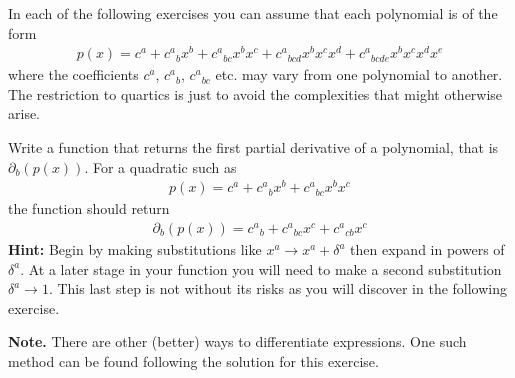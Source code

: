 \documentclass[a4paper,12pt]{article}
\numberwithin{equation}{section}%
\begin{document}
\begin{Exercises}

   In each of the following exercises you can assume that each polynomial is of the form
   \begin{align*}
      p(x) = c^{a}
           + c^{a}{}_{b} x^b
           + c^{a}{}_{b c} x^b x^c
           + c^{a}{}_{b c d} x^b x^c x^d
           + c^{a}{}_{b c d e} x^b x^c x^d x^e
   \end{align*}
   where the coefficients $c^{a}$, $c^{a}{}_{b}$, $c^{a}{}_{b c}$ etc. may vary from one
   polynomial to another. The restriction to quartics is just to avoid the complexities that
   might otherwise arise.

   \begin{Exercise}
      Write a function that returns the first partial derivative of a polynomial, that is
      $\partial_{b}(p(x))$. For a quadratic such as
      \begin{align*}
         p(x) = c^{a}
              + c^{a}{}_{b} x^b
              + c^{a}{}_{b c} x^b x^c
      \end{align*}
      the function should return
      \begin{align*}
        \partial_{b}(p(x)) = c^{a}{}_{b}
                           + c^{a}{}_{b c} x^c
                           + c^{a}{}_{c b} x^c
      \end{align*}
      {\bf Hint:} Begin by making substitutions like $x^{a} \rightarrow x^{a} + \delta^{a}$
      then expand in powers of $\delta^{a}$. At a later stage in your function you will need
      to make a second substitution $\delta^{a} \rightarrow 1$. This last step is not
      without its risks as you will discover in the following exercise.

      {\bf Note.} There are other (better) ways to differentiate expressions. One
                  such method can be found following the solution for this exercise.
   \end{Exercise}


\end{Exercises}
\end{document}

